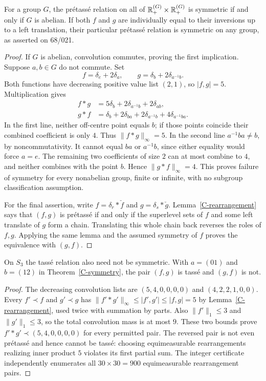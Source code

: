\begin{theorem}\label{C-symmetry}
For a group $G$, the pr\'etass\'e relation on all of
${\mathbb{R}}^{(G)}_+\times{\ensuremath{\mathbb{R}}}^{(G)}_+$ is symmetric if and only if $G$ is abelian.
If both $f$ and $g$ are individually equal to their inversions up to a
left translation, their particular pr\'etass\'e relation is symmetric on
any group, as asserted on 68/021.
\end{theorem}
\begin{proof}
If $G$ is abelian, convolution commutes, proving the first implication.
Suppose $a,b\in G$ do not commute. Set
\[
 f=\delta_e+2\delta_a,\qquad
 g=\delta_b+2\delta_{a^{-1}b}.
\]
Both functions have decreasing positive value list $(2,1)$, so $|f,g|=5$.
Multiplication gives
\[
 \begin{split}
 f*g&=5\delta_b+2\delta_{a^{-1}b}+2\delta_{ab},\\
 g*f&=\delta_b+2\delta_{ba}+2\delta_{a^{-1}b}
                         +4\delta_{a^{-1}ba}.
 \end{split}
\]
In the first line, neither off-centre point equals $b$; if those points
coincide their combined coefficient is only $4$. Thus $\|f*g\|_\infty=5$.
In the second line $a^{-1}ba\ne b$, by noncommutativity. It cannot equal
$ba$ or $a^{-1}b$, since either equality would force $a=e$.
The remaining two coefficients of size $2$ can at most combine to $4$,
and neither combines with the point $b$. Hence $\|g*f\|_\infty=4$.
This proves failure of symmetry for every nonabelian group, finite or
infinite, with no subgroup classification assumption.

For the final assertion, write $f=\delta_r*\check f$ and
$g=\delta_s*\check g$. Lemma~\ref{C-rearrangement} says that
$(f,g)$ is pr\'etass\'e if and only if the superlevel sets of $f$ and some
left translate of $g$ form a chain. Translating this whole chain back
reverses the roles of $f,g$. Applying the same lemma and the assumed
symmetry of $f$ proves the equivalence with $(g,f)$.
\end{proof}

\begin{proposition}\label{C-packed-asymmetry}
On $S_3$ the tass\'e relation also need not be symmetric. With
$a=(01)$ and $b=(12)$ in Theorem~\ref{C-symmetry}, the pair $(f,g)$ is
tass\'e and $(g,f)$ is not.
\end{proposition}
\begin{proof}
The decreasing convolution lists are $(5,4,0,0,0,0)$ and
$(4,2,2,1,0,0)$. Every $f'\prec f$ and $g'\prec g$ has
$\|f'*g'\|_\infty\leq|f',g'|\leq|f,g|=5$ by
Lemma~\ref{C-rearrangement}, used twice with summation by parts.
Also $\|f'\|_1\leq3$ and $\|g'\|_1\leq3$, so the total convolution mass
is at most $9$. These two bounds prove
$f'*g'\prec(5,4,0,0,0,0)$ for every permitted pair.
The reversed pair is not even pr\'etass\'e and hence cannot be tass\'e:
choosing equimeasurable rearrangements realizing inner product $5$
violates its first partial sum. The integer certificate independently
enumerates all $30\times30=900$ equimeasurable rearrangement pairs.
\end{proof}

